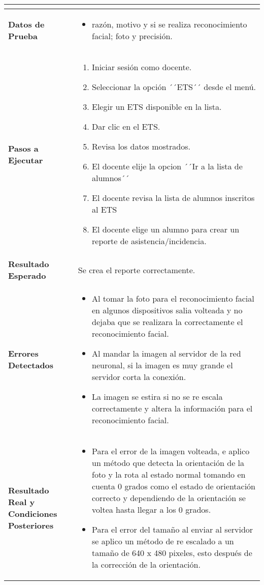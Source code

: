 \begin{longtable}{|p{5cm}|p{10cm}|}
\begin{itemize}
	\end{itemize} \\
	\hline
	\textbf{Datos de Prueba} & 
	\begin{itemize}
		\item razón, motivo y si se realiza reconocimiento facial; foto y precisión. 
	\end{itemize} \\
	\hline
	\textbf{Pasos a Ejecutar} & 
	\begin{enumerate}
		\item Iniciar sesión como docente.
		\item Seleccionar la opción ´´ETS´´ desde el menú.
		\item Elegir un ETS disponible en la lista.
		\item Dar clic en el ETS.
		\item Revisa los datos mostrados.
		\item El docente elije la opcion ´´Ir a la lista de alumnos´´
		\item El docente revisa la lista de alumnos inscritos al ETS
		\item El docente elige un alumno para crear un reporte de asistencia/incidencia.
	\end{enumerate} \\
	\hline
	\textbf{Resultado Esperado} & 
	Se crea el reporte correctamente. \\	
	\hline
	\textbf{Errores Detectados} & 
	\begin{itemize}
		\item Al tomar la foto para el reconocimiento facial en algunos dispositivos salia volteada y no dejaba que se realizara la correctamente el reconocimiento facial.
		\item Al mandar la imagen al servidor de la red neuronal, si la imagen es muy grande el servidor corta la conexión. 
		\item La imagen se estira si no se re escala correctamente y altera la información para el reconocimiento facial.
	\end{itemize} \\
	\hline
	\textbf{Resultado Real y Condiciones Posteriores} & 
	\begin{itemize}
		\item Para el error de la imagen volteada, e aplico un método que detecta la orientación de la foto y la rota al estado normal tomando en cuenta 0 grados como el estado de orientación correcto y dependiendo de la orientación se voltea hasta llegar a los 0 grados. 
		\item Para el error del tamaño al enviar al servidor se aplico un método de re escalado a un tamaño de 640 x 480 pixeles, esto después de la corrección de la orientación.

\end{itemize}
\end{longtable}
